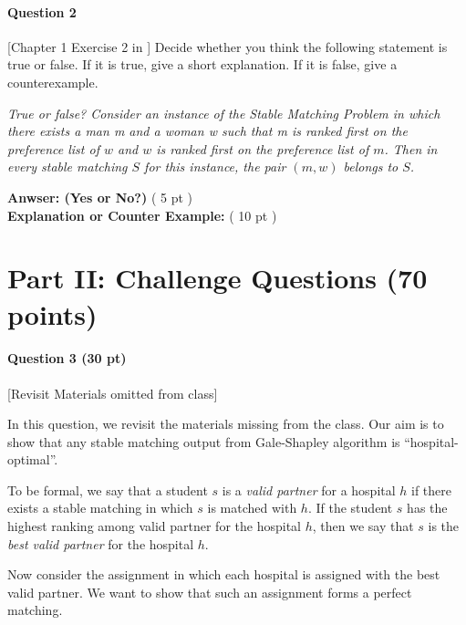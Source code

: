 \documentclass[11pt,letterpaper]{article}
\begin{document}
	\bigskip

	\paragraph*{Question 2}[Chapter 1 Exercise 2 in \cite{KT05}] Decide whether you think the following statement is true or false. If it is  true, give a short explanation. If it is false, give a counterexample.
	
	\medskip
	
	\emph{True or false? Consider an instance of the Stable Matching Problem in which there exists a man m and a woman w such that m is ranked first on the preference list of $w$ and $w$ is ranked first on the preference list of $m$. Then in  every stable matching $S$ for this instance, the pair $(m, w)$ belongs to $S$.}

	\medskip

	\noindent
	{\bf Anwser: (Yes or No?)} ( 5 pt )\\
	{\bf Explanation or Counter Example:} ( 10 pt )\\
	
	\bigskip

\pagebreak

\section*{Part II: Challenge Questions (70 points)}

\paragraph*{Question 3 (30 pt)} [Revisit Materials omitted from class]

In this question, we revisit the materials missing from the class. Our aim is to show that any stable matching output from Gale-Shapley algorithm is ``hospital-optimal''.

To be formal, we say that a student $s$ is a {\em valid partner} for a hospital $h$ if there exists a stable matching in which $s$ is matched with $h$. If the student $s$ has the highest ranking among valid partner for the hospital $h$, then we say that $s$ is the {\em best valid partner} for the hospital $h$.

Now consider the assignment in which each hospital is assigned with the best valid partner. We want to show that such an assignment forms a perfect matching. 

\medskip
\end{document}

